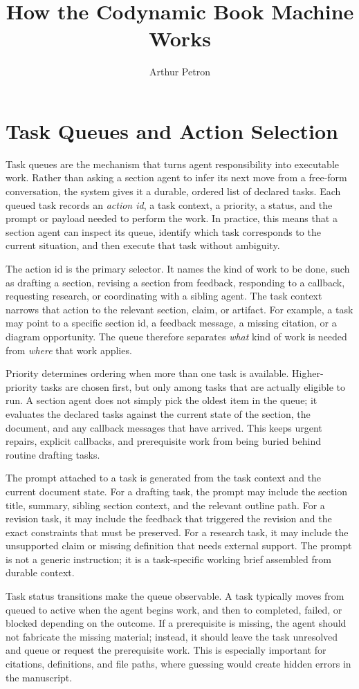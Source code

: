 \documentclass[11pt]{article}
\title{How the Codynamic Book Machine Works}
\author{Arthur Petron}
\begin{document}
\section*{Task Queues and Action Selection}

Task queues are the mechanism that turns agent responsibility into executable work. Rather than asking a section agent to infer its next move from a free-form conversation, the system gives it a durable, ordered list of declared tasks. Each queued task records an \emph{action id}, a task context, a priority, a status, and the prompt or payload needed to perform the work. In practice, this means that a section agent can inspect its queue, identify which task corresponds to the current situation, and then execute that task without ambiguity.

The action id is the primary selector. It names the kind of work to be done, such as drafting a section, revising a section from feedback, responding to a callback, requesting research, or coordinating with a sibling agent. The task context narrows that action to the relevant section, claim, or artifact. For example, a task may point to a specific section id, a feedback message, a missing citation, or a diagram opportunity. The queue therefore separates \emph{what} kind of work is needed from \emph{where} that work applies.

Priority determines ordering when more than one task is available. Higher-priority tasks are chosen first, but only among tasks that are actually eligible to run. A section agent does not simply pick the oldest item in the queue; it evaluates the declared tasks against the current state of the section, the document, and any callback messages that have arrived. This keeps urgent repairs, explicit callbacks, and prerequisite work from being buried behind routine drafting tasks.

The prompt attached to a task is generated from the task context and the current document state. For a drafting task, the prompt may include the section title, summary, sibling section context, and the relevant outline path. For a revision task, it may include the feedback that triggered the revision and the exact constraints that must be preserved. For a research task, it may include the unsupported claim or missing definition that needs external support. The prompt is not a generic instruction; it is a task-specific working brief assembled from durable context.

Task status transitions make the queue observable. A task typically moves from queued to active when the agent begins work, and then to completed, failed, or blocked depending on the outcome. If a prerequisite is missing, the agent should not fabricate the missing material; instead, it should leave the task unresolved and queue or request the prerequisite work. This is especially important for citations, definitions, and file paths, where guessing would create hidden errors in the manuscript.
\end{document}
